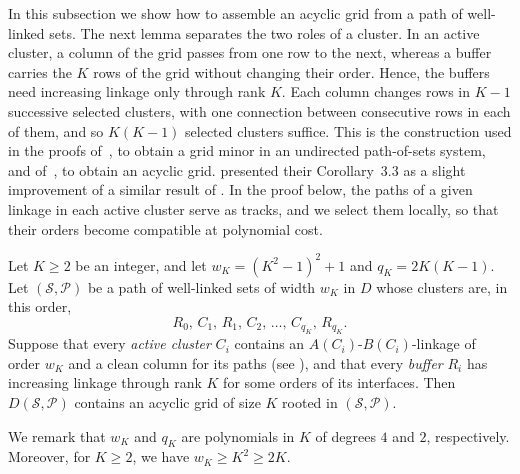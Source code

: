 \documentclass[fontsize=12pt,leading=14pt]{fullpaper}
\newcommand{\Pcal}{\mathcal{P}}
\newcommand{\Scal}{\mathcal{S}}
\begin{document}
In this subsection we show how to assemble an acyclic grid from a path of well-linked sets.
The next lemma separates the two roles of a cluster.
In an active cluster, a column of the grid passes from one row to the next, whereas a buffer carries the $K$ rows of the grid without changing their order.
Hence, the buffers need increasing linkage only through rank $K$.
Each column changes rows in $K-1$ successive selected clusters, with one connection between consecutive rows in each of them, and so $K(K-1)$ selected clusters suffice.
This is the construction used in the proofs of~\cite[Corollary~3.3]{CC16}, to obtain a grid minor in an undirected path-of-sets system, and of~\cite[Theorem~7.5]{HKMM26a}, to obtain an acyclic grid.
\textcite{CC16} presented their Corollary~3.3 as a slight improvement of a similar result of \textcite{LeafS15}.
In the proof below, the paths of a given linkage in each active cluster serve as tracks, and we select them locally, so that their orders become compatible at polynomial cost.

\begin{lemma}\label{lem:s3-assembly}
  Let $K\ge2$ be an integer, and let $w_K=(K^2-1)^2+1$ and $q_K=2K(K-1)$.
  Let $(\Scal,\Pcal)$ be a path of well-linked sets of width $w_K$ in $D$ whose clusters are, in this order,
  \[
    R_0,\,C_1,\,R_1,\,C_2,\,\dots,\,C_{q_K},\,R_{q_K}.
  \]
  Suppose that every \emph{active cluster} $C_i$ contains an $A(C_i)$-$B(C_i)$-linkage of order $w_K$ and a clean column for its paths (see ), and that every \emph{buffer} $R_i$ has increasing linkage through rank $K$ for some orders of its interfaces.
  Then $D(\Scal,\Pcal)$ contains an acyclic grid of size $K$ rooted in $(\Scal,\Pcal)$.
\end{lemma}

We remark that $w_K$ and $q_K$ are polynomials in $K$ of degrees $4$ and $2$, respectively.
Moreover, for $K\ge2$, we have $w_K\ge K^2\ge2K$.
\end{document}

